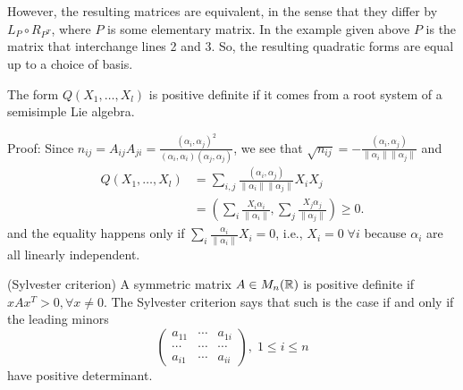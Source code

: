 \begin{itemize}
However, the resulting matrices are equivalent, in the sense that they differ by $L_{P}\circ R_{P^T}$, where $P$ is 
some elementary matrix. In the example given above $P$ is the matrix that interchange lines 2 and 3. So, the resulting 
quadratic forms are equal up to a choice of basis. 
\begin{dang}
    \begin{lemma}
      The form $Q(X_1,\dots, X_l)$ is positive definite if it comes from a root system of a semisimple Lie algebra.     
    \end{lemma}
\end{dang}
Proof: Since $n_{ij}=A_{ij}A_{ji}=\frac{(\alpha_i,\alpha_j)^2}{(\alpha_i,\alpha_i)(\alpha_j,\alpha_j)}$, we see that 
$\sqrt{n_{ij}}=-\tfrac{(\alpha_i,\alpha_j)}{\|\alpha_i\|\|\alpha_j\|}$ and  
\begin{equation}
    \begin{split}
        Q(X_1,\dots, X_l)&=\sum_{i,j}\frac{(\alpha_i,\alpha_j)}{\|\alpha_i\|\|\alpha_j\|}X_iX_j\\
          &=(\sum_i \frac{X_i\alpha_i }{\|\alpha_i\|},\sum_j \frac{X_j\alpha_j }{\|\alpha_j\|})\geq0.
    \end{split}
\end{equation}
and the equality happens only if $\sum_i\tfrac{\alpha_i }{\|\alpha_i\|}X_i=0$, i.e., $X_i=0\;\forall i$ because $\alpha_i$ are 
all linearly independent.


\begin{dang}
    \begin{lemma}(Sylvester criterion)
        A symmetric matrix $A\in M_n(\mathbb{R})$ is positive definite if $xAx^T>0,\forall x\neq 0$. The Sylvester criterion says that such is 
        the case if and only if the leading minors 
        \begin{equation}
            \begin{pmatrix}
                a_{11}&\cdots& a_{1i}\\
                 \cdots&\cdots&\cdots\\
                a_{i1}&\cdots &a_{ii} 
            \end{pmatrix},\;1\leq i\leq n
        \end{equation}
         have positive determinant.
    \end{lemma}
\end{dang} 


\end{itemize}

